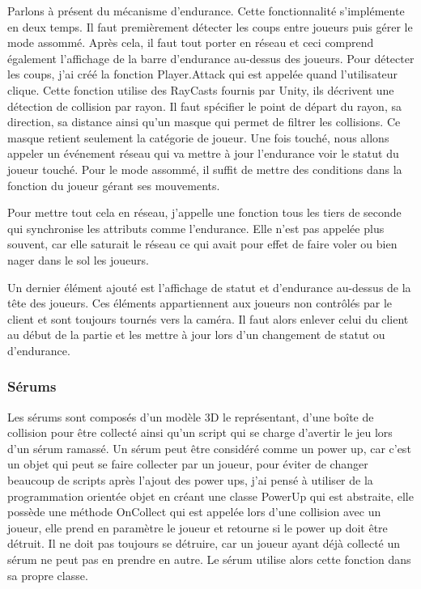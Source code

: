 \documentclass{article}
\begin{document}
Parlons à présent du mécanisme d'endurance.
Cette fonctionnalité s'implémente en deux temps. Il faut premièrement détecter les coups entre joueurs puis gérer le mode assommé. Après cela, il faut tout porter en réseau et ceci comprend également l'affichage de la barre d'endurance au-dessus des joueurs. Pour détecter les coups, j'ai créé la fonction Player.Attack qui est appelée quand l'utilisateur clique. Cette fonction utilise des RayCasts fournis par Unity, ils décrivent une détection de collision par rayon. Il faut spécifier le point de départ du rayon, sa direction, sa distance ainsi qu'un masque qui permet de filtrer les collisions. Ce masque retient seulement la catégorie de joueur. Une fois touché, nous allons appeler un événement réseau qui va mettre à jour l'endurance voir le statut du joueur touché.
Pour le mode assommé, il suffit de mettre des conditions dans la fonction du joueur gérant ses mouvements.


Pour mettre tout cela en réseau, j'appelle une fonction tous les tiers de seconde qui synchronise les attributs comme l'endurance.
Elle n'est pas appelée plus souvent, car elle saturait le réseau ce qui avait pour effet de faire voler ou bien nager dans le sol les joueurs.


Un dernier élément ajouté est l'affichage de statut et d'endurance au-dessus de la tête des joueurs. Ces éléments appartiennent aux joueurs non contrôlés par le client et sont toujours tournés vers la caméra. Il faut alors enlever celui du client au début de la partie et les mettre à jour lors d'un changement de statut ou d'endurance.


\subsubsection{Sérums}


Les sérums sont composés d'un modèle 3D le représentant, d'une boîte de collision pour être collecté ainsi qu'un script qui se charge d'avertir le jeu lors d'un sérum ramassé.
Un sérum peut être considéré comme un power up, car c'est un objet qui peut se faire collecter par un joueur, pour éviter de changer beaucoup de scripts après l'ajout des power ups, j'ai pensé à utiliser de la programmation orientée objet en créant une classe PowerUp qui est abstraite, elle possède une méthode OnCollect qui est appelée lors d'une collision avec un joueur, elle prend en paramètre le joueur et retourne si le power up doit être détruit. Il ne doit pas toujours se détruire, car un joueur ayant déjà collecté un sérum ne peut pas en prendre en autre. Le sérum utilise alors cette fonction dans sa propre classe.
\end{document}
